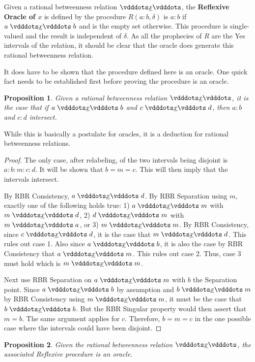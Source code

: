 \documentclass[12pt]{article}
\newtheorem{proposition}{Proposition}[section]
\begin{document}
Given a rational betweenness relation $\xrel$, the \textbf{Reflexive Oracle of $x$} is defined by the procedure $R(a:b, \delta)$ is $a:b$ if $a \xrel b$ and is the empty set otherwise. This procedure is single-valued and the result is independent of $\delta$. As all the prophecies of $R$ are the Yes intervals of the relation, it should be clear that the oracle does generate this rational betweenness relation. 

It does have to be shown that the procedure defined here is an oracle. One quick fact needs to be established first before proving the procedure is an oracle. 

\begin{proposition}
    Given a rational betweenness relation $\xrel$, it is the case that if $a \xrel b$ and $c \xrel d$, then $a:b$ and $c:d$ intersect. 
\end{proposition}

While this is basically a postulate for oracles, it is a deduction for rational betweenness relations. 

\begin{proof}
    The only case, after relabeling, of the two intervals being disjoint is $a:b:m:c:d$. It will be shown that $b = m = c$. This will then imply that the intervals intersect. 
    
    By RBR Consistency, $a \xrel d$. By RBR Separation using $m$, exactly one of the following holds true: 1) $a \xrel m$ with \sout{$m \xrel d$}, 2) $d \xrel m$ with \sout{$m \xrel a$}, or 3) $m \xrel m$. By RBR Consistency, since $c \xrel d$, it is the case that $m \xrel d$. This rules out case 1. Also since $a \xrel b$, it is also the case by RBR Consistency that $a \xrel m$. This rules out case 2. Thus, case 3 must hold which is $m \xrel m$. 
    
    Next use RBR Separation on $a \xrel m$ with $b$ the Separation point. Since $a \xrel b$ by assumption and $b \xrel m$ by RBR Consistency using $m \xrel m$, it must be the case that $b \xrel b$. But the RBR Singular property would then assert that $m = b$. The same argument applies for $c$. Therefore, $b = m = c$ in the one possible case where the intervals could have been disjoint. 
\end{proof}

\begin{proposition}
    Given the rational betweenness relation $\xrel$, the associated Reflexive procedure is an oracle. 
\end{proposition}
\end{document}
